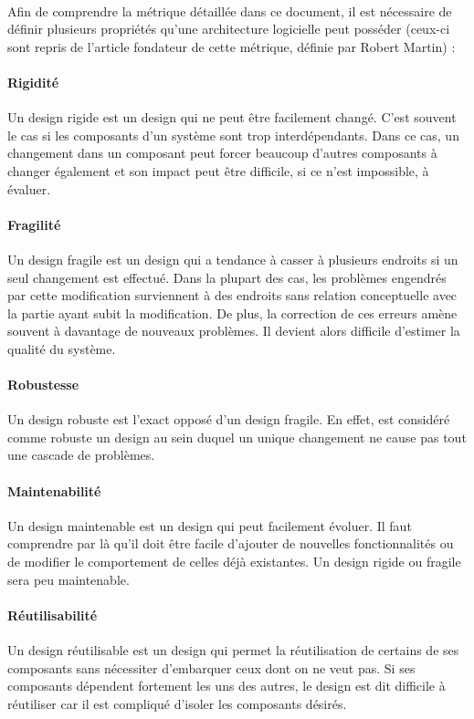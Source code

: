 \documentclass{scrartcl}
\begin{document}
    \paragraph{}Afin de comprendre la métrique détaillée dans ce document, il est nécessaire de définir plusieurs propriétés qu'une architecture logicielle peut posséder (ceux-ci sont repris de l'article fondateur de cette métrique, définie par Robert Martin\cite{Martin:1994}) :
    
    \paragraph{Rigidité}Un design rigide est un design qui ne peut être facilement changé. C'est souvent le cas si les composants d'un système sont trop interdépendants. Dans ce cas, un changement dans un composant peut forcer beaucoup d'autres composants à changer également et son impact peut être difficile, si ce n'est impossible, à évaluer.

    \paragraph{Fragilité}Un design fragile est un design qui a tendance à casser à plusieurs endroits si un seul changement est effectué. Dans la plupart des cas, les problèmes engendrés par cette modification surviennent à des endroits sans relation conceptuelle avec la partie ayant subit la modification. De plus, la correction de ces erreurs amène souvent à davantage de nouveaux problèmes. Il devient alors difficile d'estimer la qualité du système.
    
    \paragraph{Robustesse}Un design robuste est l'exact opposé d'un design fragile. En effet, est considéré comme robuste un design au sein duquel un unique changement ne cause pas tout une cascade de problèmes.

    \paragraph{Maintenabilité}Un design maintenable est un design qui peut facilement évoluer. Il faut comprendre par là qu'il doit être facile d'ajouter de nouvelles fonctionnalités ou de modifier le comportement de celles déjà existantes. Un design rigide ou fragile sera peu maintenable.

    \paragraph{Réutilisabilité}Un design réutilisable est un design qui permet la réutilisation de certains de ses composants sans nécessiter d'embarquer ceux dont on ne veut pas. Si ses composants dépendent fortement les uns des autres, le design est dit difficile à réutiliser car il est compliqué d'isoler les composants désirés.
    
\end{document}
